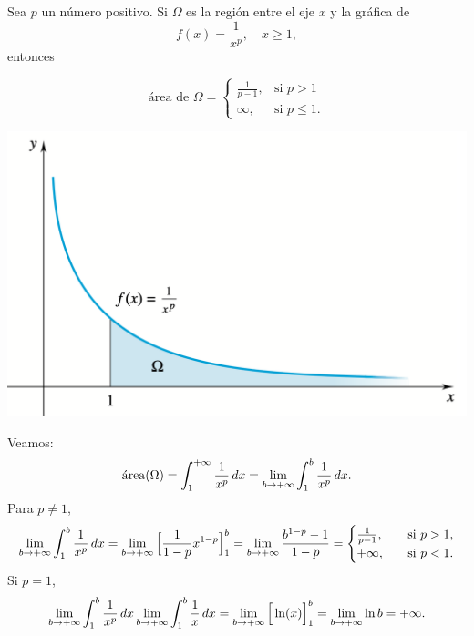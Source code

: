 \begin{example}
Sea $p$ un número positivo. Si $\Omega$ es la región entre el eje $x$ y la gráfica de 
\[
f(x) = \frac{1}{x^p}, \quad x \geq 1,
\]
entonces

\noindent
\begin{minipage}{.4\textwidth}
  \[
\text{área de } \Omega = \begin{cases}
\frac{1}{p-1}, & \text{si } p > 1 \\
\infty, & \text{si } p \leq 1.
\end{cases}
\]
\end{minipage}
\begin{minipage}{.59\textwidth}
  \begin{center}
  \includegraphics[width=.9\textwidth]{pics/area-bajo-x-a-la-p.png}
  \end{center}
\end{minipage}

Veamos:
\[
\mathrm{\protect\acute{a}rea}(\Omega) 
= \int_1^{+\infty} \frac1{x^p} \,dx 
= \lim_{b\to+\infty}\int_1^b \frac1{x^p} \,dx .
\]
Para $p\neq 1$,
\[
  \lim_{b\to+\infty}\int_1^b \frac1{x^p} \,dx 
  = \lim_{b\to+\infty} \Big[ \frac{1}{1-p} x^{1-p}\Big]_1^b
  = \lim_{b\to+\infty} \frac{b^{1-p}-1}{1-p}
  = \begin{cases}
    \frac{1}{p-1}, \quad&\text{si } p>1,
    \\
    +\infty, \quad&\text{si } p<1.
  \end{cases}
\]
Si $p=1$,
\[
  \lim_{b\to+\infty}\int_1^b \frac1{x^p} \,dx 
  \lim_{b\to+\infty}\int_1^b \frac1{x} \,dx 
  = \lim_{b\to+\infty} \Big[ \ln(x)\Big]_1^b
  = \lim_{b\to+\infty} \ln b = +\infty.
\]
\end{example}

